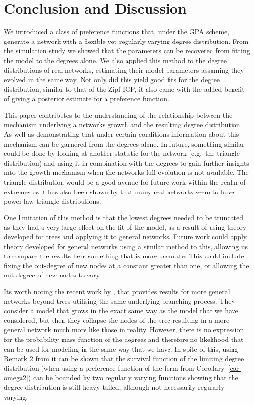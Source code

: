 \documentclass[
  sn-basic,
  10pt,
]{sn-jnl}
\theoremstyle{thmstyleone}
\theoremstyle{thmstyleone}
\theoremstyle{remark}
\theoremstyle{plain}
\theoremstyle{plain}
\theoremstyle{remark}
\begin{document}
\section{Conclusion and Discussion}\label{sec-conc}

We introduced a class of preference functions that, under the GPA
scheme, generate a network with a flexible yet regularly varying degree
distribution. From the simulation study we showed that the parameters
can be recovered from fitting the model to the degrees alone. We also
applied this method to the degree distributions of real networks,
estimating their model parameters assuming they evolved in the same way.
Not only did this yield good fits for the degree distribution, similar
to that of the Zipf-IGP, it also came with the added benefit of giving a
posterior estimate for a preference function.

This paper contributes to the understanding of the relationship between
the mechanism underlying a networks growth and the resulting degree
distribution. As well as demonstrating that under certain conditions
information about this mechanism can be garnered from the degrees alone.
In future, something similar could be done by looking at another
statistic for the network (e.g.~the triangle distribution) and using it
in combination with the degrees to gain further insights into the growth
mechanism when the networks full evolution is not available. The
triangle distribution would be a good avenue for future work within the
realm of extremes as it has also been shown by \citet{kang11} that many
real networks seem to have power law triangle distributions.

One limitation of this method is that the lowest degrees needed to be
truncated as they had a very large effect on the fit of the model, as a
result of using theory developed for trees and applying it to general
networks. Future work could apply theory developed for general networks
using a similar method to this, allowing us to compare the results here
something that is more accurate. This could include fixing the
out-degree of new nodes at a constant greater than one, or allowing the
out-degree of new nodes to vary.

Its worth noting the recent work by \citet{banerjee25}, that provides
results for more general networks beyond trees utilising the same
underlying branching process. They consider a model that grows in the
exact same way as the model that we have considered, but then they
collapse the nodes of the tree resulting in a more general network much
more like those in reality. However, there is no expression for the
probability mass function of the degrees and therefore no likelihood
that can be used for modeling in the same way that we have. In spite of
this, using Remark 2 from \citet{banerjee25} it can be shown that the
survival function of the limiting degree distribution (when using a
preference function of the form from Corollary~\ref{cor-omega2}) can be
bounded by two regularly varying functions showing that the degree
distribution is still heavy tailed, although not necessarily regularly
varying.
\end{document}
